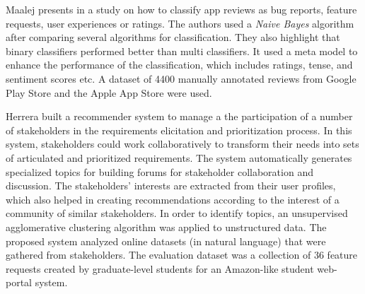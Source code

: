 Maalej \etal presents in \cite{Maalej} a study on how to classify app reviews as
bug reports, feature requests, user experiences or ratings. The authors used a
\emph{Naive Bayes} algorithm after comparing several algorithms for
classification. They also highlight that binary classifiers performed better
than multi classifiers. It used a meta model to enhance the performance of the
classification, which includes ratings, tense, and sentiment scores etc. A
dataset of 4400 manually annotated reviews from Google Play Store and the Apple
App Store were used.

Herrera \etal \cite{Castro-Herrera:2009} built a recommender system to manage a
the participation of a number of stakeholders in the requirements elicitation
and prioritization process. In this system, stakeholders could work
collaboratively to transform their needs into sets of articulated and
prioritized requirements.
The system automatically generates specialized topics for building forums for
stakeholder collaboration and discussion. The stakeholders' interests are
extracted from their user profiles, which also helped in creating
recommendations according to the interest of a community of similar
stakeholders. In order to identify topics, an unsupervised agglomerative
clustering algorithm was applied to unstructured data. The proposed system
analyzed online datasets (in natural language) that were gathered from
stakeholders. The evaluation dataset was a collection of 36 feature requests
created by graduate-level students for an Amazon-like student web-portal system.






